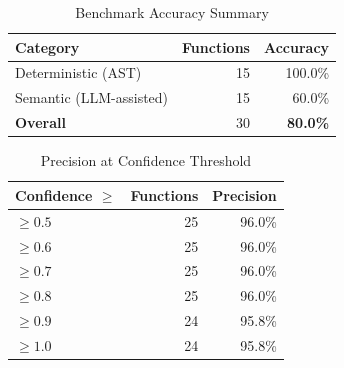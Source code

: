 \begin{table}[h]
  \centering
  \caption{Benchmark Accuracy Summary}
  \label{tab:accuracy}
  \begin{tabular}{lrr}
    \toprule
    Category & Functions & Accuracy \\
    \midrule
    Deterministic (AST) & 15 & 100.0\% \\
    Semantic (LLM-assisted) & 15 & 60.0\% \\
    \midrule
    \textbf{Overall} & 30 & \textbf{80.0\%} \\
    \bottomrule
  \end{tabular}
\end{table}

\begin{table}[h]
  \centering
  \caption{Precision at Confidence Threshold}
  \label{tab:precision-confidence}
  \begin{tabular}{lrr}
    \toprule
    Confidence $\geq$ & Functions & Precision \\
    \midrule
    $\geq 0.5$ & 25 & 96.0\% \\
    $\geq 0.6$ & 25 & 96.0\% \\
    $\geq 0.7$ & 25 & 96.0\% \\
    $\geq 0.8$ & 25 & 96.0\% \\
    $\geq 0.9$ & 24 & 95.8\% \\
    $\geq 1.0$ & 24 & 95.8\% \\
    \bottomrule
  \end{tabular}
\end{table}

